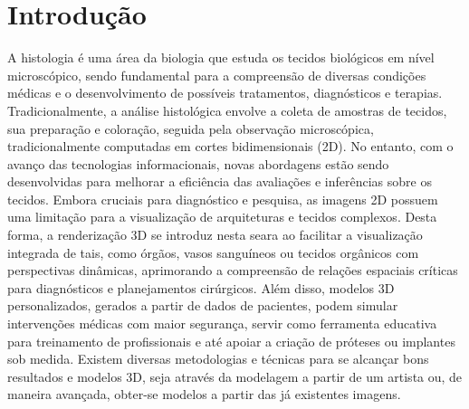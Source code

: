 \section{Introdução}
\label{sec:introducao}

A histologia é uma área da biologia que estuda os tecidos biológicos em nível microscópico, sendo fundamental para a compreensão de diversas condições médicas e o desenvolvimento de possíveis tratamentos, diagnósticos e terapias. Tradicionalmente, a análise histológica envolve a coleta de amostras de tecidos, sua preparação e coloração, seguida pela observação microscópica, tradicionalmente computadas em cortes bidimensionais (2D). No entanto, com o avanço das tecnologias informacionais, novas abordagens estão sendo desenvolvidas para melhorar a eficiência das avaliações e inferências sobre os tecidos. Embora cruciais para diagnóstico e pesquisa, as imagens 2D possuem uma limitação para a visualização de arquiteturas e tecidos complexos. Desta forma, a renderização 3D se introduz nesta seara ao facilitar a visualização integrada de tais, como órgãos, vasos sanguíneos ou tecidos orgânicos com perspectivas dinâmicas, aprimorando a compreensão de relações espaciais críticas para diagnósticos e planejamentos cirúrgicos. Além disso, modelos 3D personalizados, gerados a partir de dados de pacientes, podem simular intervenções médicas com maior segurança, servir como ferramenta educativa para treinamento de profissionais e até apoiar a criação de próteses ou implantes sob medida. Existem diversas metodologias e técnicas para se alcançar bons resultados e modelos 3D, seja através da modelagem a partir de um artista ou, de maneira avançada, obter-se modelos a partir das já existentes imagens.

